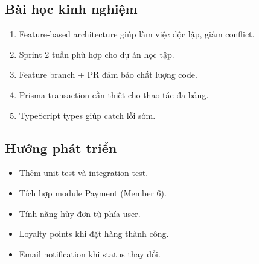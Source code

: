 \documentclass[12pt,a4paper]{article}
\begin{document}
\subsection{Bài học kinh nghiệm}
\begin{enumerate}
  \item Feature-based architecture giúp làm việc độc lập, giảm conflict.
  \item Sprint 2 tuần phù hợp cho dự án học tập.
  \item Feature branch + PR đảm bảo chất lượng code.
  \item Prisma transaction cần thiết cho thao tác đa bảng.
  \item TypeScript types giúp catch lỗi sớm.
\end{enumerate}

\subsection{Hướng phát triển}
\begin{itemize}
  \item Thêm unit test và integration test.
  \item Tích hợp module Payment (Member 6).
  \item Tính năng hủy đơn từ phía user.
  \item Loyalty points khi đặt hàng thành công.
  \item Email notification khi status thay đổi.
\end{itemize}
\end{document}
